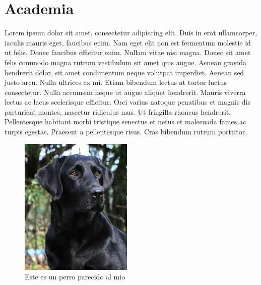 	\section{Academia}
	Lorem ipsum dolor sit amet, consectetur adipiscing elit. Duis in erat 		ullamcorper, iaculis mauris eget, faucibus enim. Nam eget elit non est 		fermentum molestie id ut felis. Donec faucibus efficitur enim. Nullam 		vitae 		nisi magna. Donec sit amet felis commodo magna rutrum 			vestibulum sit amet quis augue. Aenean gravida hendrerit dolor, sit amet 		condimentum neque volutpat imperdiet. Aenean sed justo arcu. Nulla 			ultrices ex mi. Etiam bibendum lectus at tortor luctus consectetur. Nulla 	accumsan neque ut augue aliquet hendrerit. Mauris viverra lectus ac lacus 	scelerisque efficitur. Orci varius natoque penatibus et magnis dis 			parturient montes, nascetur ridiculus mus. Ut fringilla rhoncus   			hendrerit. Pellentesque habitant morbi tristique senectus et netus et  		malesuada fames ac turpis egestas. Praesent a pellentesque risus. Cras 		bibendum rutrum porttitor.
		\begin{figure}[h!]
			\centering
			\includegraphics[scale=0.8]{perro.jpg}
			\caption{Este es un perro parecido al mio}
		\end{figure}		
